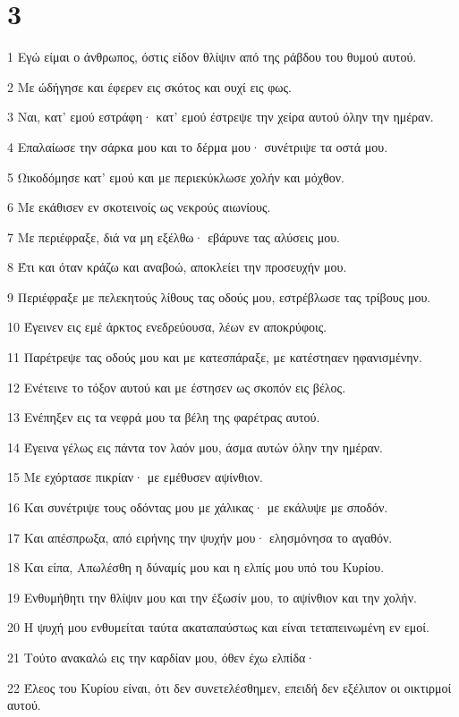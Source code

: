 \chapter{3}

\par 1 Εγώ είμαι ο άνθρωπος, όστις είδον θλίψιν από της ράβδου του θυμού αυτού.
\par 2 Με ώδήγησε και έφερεν εις σκότος και ουχί εις φως.
\par 3 Ναι, κατ' εμού εστράφη· κατ' εμού έστρεψε την χείρα αυτού όλην την ημέραν.
\par 4 Επαλαίωσε την σάρκα μου και το δέρμα μου· συνέτριψε τα οστά μου.
\par 5 Ωικοδόμησε κατ' εμού και με περιεκύκλωσε χολήν και μόχθον.
\par 6 Με εκάθισεν εν σκοτεινοίς ως νεκρούς αιωνίους.
\par 7 Με περιέφραξε, διά να μη εξέλθω· εβάρυνε τας αλύσεις μου.
\par 8 Έτι και όταν κράζω και αναβοώ, αποκλείει την προσευχήν μου.
\par 9 Περιέφραξε με πελεκητούς λίθους τας οδούς μου, εστρέβλωσε τας τρίβους μου.
\par 10 Έγεινεν εις εμέ άρκτος ενεδρεύουσα, λέων εν αποκρύφοις.
\par 11 Παρέτρεψε τας οδούς μου και με κατεσπάραξε, με κατέστηαεν ηφανισμένην.
\par 12 Ενέτεινε το τόξον αυτού και με έστησεν ως σκοπόν εις βέλος.
\par 13 Ενέπηξεν εις τα νεφρά μου τα βέλη της φαρέτρας αυτού.
\par 14 Έγεινα γέλως εις πάντα τον λαόν μου, άσμα αυτών όλην την ημέραν.
\par 15 Με εχόρτασε πικρίαν· με εμέθυσεν αψίνθιον.
\par 16 Και συνέτριψε τους οδόντας μου με χάλικας· με εκάλυψε με σποδόν.
\par 17 Και απέσπρωξα, από ειρήνης την ψυχήν μου· ελησμόνησα το αγαθόν.
\par 18 Και είπα, Απωλέσθη η δύναμίς μου και η ελπίς μου υπό του Κυρίου.
\par 19 Ενθυμήθητι την θλίψιν μου και την έξωσίν μου, το αψίνθιον και την χολήν.
\par 20 Η ψυχή μου ενθυμείται ταύτα ακαταπαύστως και είναι τεταπεινωμένη εν εμοί.
\par 21 Τούτο ανακαλώ εις την καρδίαν μου, όθεν έχω ελπίδα·
\par 22 Έλεος του Κυρίου είναι, ότι δεν συνετελέσθημεν, επειδή δεν εξέλιπον οι οικτιρμοί αυτού.

